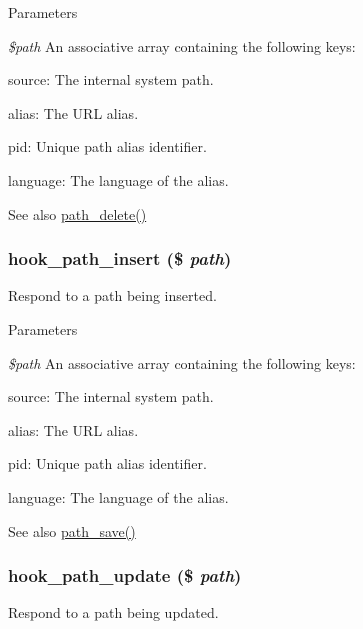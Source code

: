 \begin{DoxyParams}{Parameters}
\item[{\em \$path}]An associative array containing the following keys:
\begin{DoxyItemize}
\item source: The internal system path.
\item alias: The URL alias.
\item pid: Unique path alias identifier.
\item language: The language of the alias.
\end{DoxyItemize}\end{DoxyParams}
\begin{DoxySeeAlso}{See also}
\hyperlink{path_8inc_adbe589627a12c7be338700a1df1bc357}{path\_\-delete()} 
\end{DoxySeeAlso}
\hypertarget{group__hooks_gaa0decf43e13f49d88850786b00290d97}{
\subsubsection[{hook\_\-path\_\-insert}]{\setlength{\rightskip}{0pt plus 5cm}hook\_\-path\_\-insert (\$ {\em path})}}
\label{group__hooks_gaa0decf43e13f49d88850786b00290d97}
Respond to a path being inserted.


\begin{DoxyParams}{Parameters}
\item[{\em \$path}]An associative array containing the following keys:
\begin{DoxyItemize}
\item source: The internal system path.
\item alias: The URL alias.
\item pid: Unique path alias identifier.
\item language: The language of the alias.
\end{DoxyItemize}\end{DoxyParams}
\begin{DoxySeeAlso}{See also}
\hyperlink{path_8inc_a2560e9e01e6d4f6b38c4e55c39715e25}{path\_\-save()} 
\end{DoxySeeAlso}
\hypertarget{group__hooks_ga317c17e152ebb4fc477bb8bfe9294960}{
\subsubsection[{hook\_\-path\_\-update}]{\setlength{\rightskip}{0pt plus 5cm}hook\_\-path\_\-update (\$ {\em path})}}
\label{group__hooks_ga317c17e152ebb4fc477bb8bfe9294960}
Respond to a path being updated.


